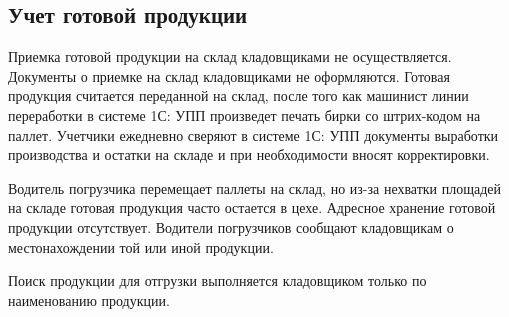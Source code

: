 \newpage
\subsection{Учет готовой продукции}
\label{bp:readygoods}

Приемка готовой продукции на склад кладовщиками не осуществляется. Документы о приемке на склад кладовщиками не оформляются. Готовая продукция считается переданной на склад, после того как машинист линии переработки в системе 1С: УПП произведет печать бирки со штрих-кодом на паллет. Учетчики ежедневно сверяют в системе 1С: УПП документы выработки производства и остатки на складе и при необходимости вносят корректировки. 

Водитель погрузчика перемещает паллеты на склад, но из-за нехватки площадей на складе готовая продукция часто остается в цехе. Адресное хранение готовой продукции отсутствует. Водители погрузчиков сообщают кладовщикам о местонахождении той или иной продукции.


Поиск продукции для отгрузки выполняется кладовщиком только по наименованию продукции. 










